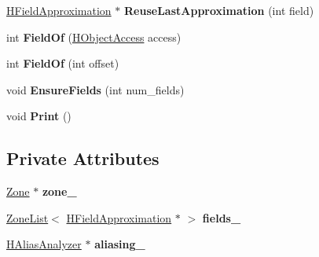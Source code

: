 \begin{DoxyCompactItemize}
\item 
\hyperlink{classv8_1_1internal_1_1_h_field_approximation}{H\+Field\+Approximation} $\ast$ {\bfseries Reuse\+Last\+Approximation} (int field)\hypertarget{classv8_1_1internal_1_1_h_load_elimination_table_af4f7ebac2a44140d83dd74e6be859830}{}\label{classv8_1_1internal_1_1_h_load_elimination_table_af4f7ebac2a44140d83dd74e6be859830}

\item 
int {\bfseries Field\+Of} (\hyperlink{classv8_1_1internal_1_1_h_object_access}{H\+Object\+Access} access)\hypertarget{classv8_1_1internal_1_1_h_load_elimination_table_a1b0d9169861b2dca93985c752aa36d75}{}\label{classv8_1_1internal_1_1_h_load_elimination_table_a1b0d9169861b2dca93985c752aa36d75}

\item 
int {\bfseries Field\+Of} (int offset)\hypertarget{classv8_1_1internal_1_1_h_load_elimination_table_a8f8f8e9bc9dcc544772a3979253d2cc8}{}\label{classv8_1_1internal_1_1_h_load_elimination_table_a8f8f8e9bc9dcc544772a3979253d2cc8}

\item 
void {\bfseries Ensure\+Fields} (int num\+\_\+fields)\hypertarget{classv8_1_1internal_1_1_h_load_elimination_table_ae91816c55d39d534e9f41c35bae0a131}{}\label{classv8_1_1internal_1_1_h_load_elimination_table_ae91816c55d39d534e9f41c35bae0a131}

\item 
void {\bfseries Print} ()\hypertarget{classv8_1_1internal_1_1_h_load_elimination_table_abf940c2d4619afd45e674958b5db08e8}{}\label{classv8_1_1internal_1_1_h_load_elimination_table_abf940c2d4619afd45e674958b5db08e8}

\end{DoxyCompactItemize}
\subsection*{Private Attributes}
\begin{DoxyCompactItemize}
\item 
\hyperlink{classv8_1_1internal_1_1_zone}{Zone} $\ast$ {\bfseries zone\+\_\+}\hypertarget{classv8_1_1internal_1_1_h_load_elimination_table_a2ffca01fcf350621a33e0703e61531e8}{}\label{classv8_1_1internal_1_1_h_load_elimination_table_a2ffca01fcf350621a33e0703e61531e8}

\item 
\hyperlink{classv8_1_1internal_1_1_zone_list}{Zone\+List}$<$ \hyperlink{classv8_1_1internal_1_1_h_field_approximation}{H\+Field\+Approximation} $\ast$ $>$ {\bfseries fields\+\_\+}\hypertarget{classv8_1_1internal_1_1_h_load_elimination_table_a6820df18d1b2f3a6a01474cf170b49ab}{}\label{classv8_1_1internal_1_1_h_load_elimination_table_a6820df18d1b2f3a6a01474cf170b49ab}

\item 
\hyperlink{classv8_1_1internal_1_1_h_alias_analyzer}{H\+Alias\+Analyzer} $\ast$ {\bfseries aliasing\+\_\+}\hypertarget{classv8_1_1internal_1_1_h_load_elimination_table_a134564e0d2ba2b510349ec8b350d08d5}{}\label{classv8_1_1internal_1_1_h_load_elimination_table_a134564e0d2ba2b510349ec8b350d08d5}

\end{DoxyCompactItemize}
